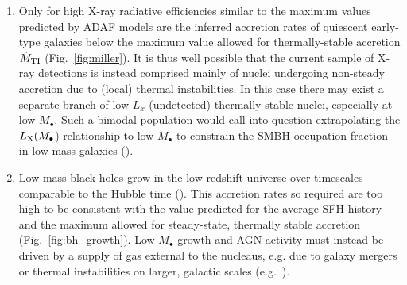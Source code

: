 \documentclass[usenatbib,fleqn]{mn2e}
\newcommand{\Mdot}{\dot{M}}
\newcommand\lsim{\mathrel{\rlap{\lower4pt\hbox{\hskip1pt$\sim$}}
    \raise1pt\hbox{$<$}}}
\newcommand{\rs}{r_s}
\newcommand{\rb}{r_b}
\newcommand{\Mbh}[1][]{M_{\bullet#1}}
\begin{document}
\begin{enumerate}
\item Only for high X-ray radiative efficiencies similar to the maximum values predicted by ADAF models are the inferred accretion rates of quiescent early-type galaxies below the maximum value allowed for thermally-stable accretion $\dot{M}_{\rm TI}$ (Fig.~\ref{fig:miller}).  It is thus well possible that the current sample of X-ray detections is instead comprised mainly of nuclei undergoing non-steady accretion due to (local) thermal instabilities.  In this case there may exist a separate branch of low $L_x$ (undetected) thermally-stable nuclei, especially at low $M_{\bullet}$.  Such a bimodal population would call into question extrapolating the $L_{\rm X}(M_{\bullet}$) relationship to low $M_{\bullet}$ to constrain the SMBH occupation fraction in low mass galaxies (\citealt{Miller+15}).

  \item Low mass black holes grow in the low redshift universe over timescales comparable to the Hubble time (\citet{Heckman+04}).  This accretion rates so required are too high to be consistent with the value predicted for the average SFH history and the maximum allowed for steady-state, thermally stable accretion (Fig.~\ref{fig:bh_growth}).  Low-$M_{\bullet}$ growth and AGN activity must instead be driven by a supply of gas external to the nucleaus, e.g. due to galaxy mergers or thermal instabilities on larger, galactic scales (e.g.~\citealt{Voit+15}).    

    

\end{enumerate}
   
\end{document}

